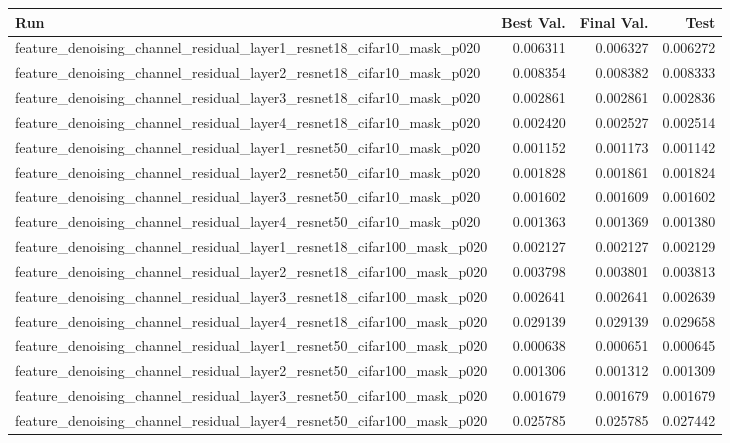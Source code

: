 \begin{tabular}{lrrr}
\toprule
Run & Best Val. & Final Val. & Test \\
\midrule
feature\_denoising\_channel\_residual\_layer1\_resnet18\_cifar10\_mask\_p020 & 0.006311 & 0.006327 & 0.006272 \\
feature\_denoising\_channel\_residual\_layer2\_resnet18\_cifar10\_mask\_p020 & 0.008354 & 0.008382 & 0.008333 \\
feature\_denoising\_channel\_residual\_layer3\_resnet18\_cifar10\_mask\_p020 & 0.002861 & 0.002861 & 0.002836 \\
feature\_denoising\_channel\_residual\_layer4\_resnet18\_cifar10\_mask\_p020 & 0.002420 & 0.002527 & 0.002514 \\
feature\_denoising\_channel\_residual\_layer1\_resnet50\_cifar10\_mask\_p020 & 0.001152 & 0.001173 & 0.001142 \\
feature\_denoising\_channel\_residual\_layer2\_resnet50\_cifar10\_mask\_p020 & 0.001828 & 0.001861 & 0.001824 \\
feature\_denoising\_channel\_residual\_layer3\_resnet50\_cifar10\_mask\_p020 & 0.001602 & 0.001609 & 0.001602 \\
feature\_denoising\_channel\_residual\_layer4\_resnet50\_cifar10\_mask\_p020 & 0.001363 & 0.001369 & 0.001380 \\
feature\_denoising\_channel\_residual\_layer1\_resnet18\_cifar100\_mask\_p020 & 0.002127 & 0.002127 & 0.002129 \\
feature\_denoising\_channel\_residual\_layer2\_resnet18\_cifar100\_mask\_p020 & 0.003798 & 0.003801 & 0.003813 \\
feature\_denoising\_channel\_residual\_layer3\_resnet18\_cifar100\_mask\_p020 & 0.002641 & 0.002641 & 0.002639 \\
feature\_denoising\_channel\_residual\_layer4\_resnet18\_cifar100\_mask\_p020 & 0.029139 & 0.029139 & 0.029658 \\
feature\_denoising\_channel\_residual\_layer1\_resnet50\_cifar100\_mask\_p020 & 0.000638 & 0.000651 & 0.000645 \\
feature\_denoising\_channel\_residual\_layer2\_resnet50\_cifar100\_mask\_p020 & 0.001306 & 0.001312 & 0.001309 \\
feature\_denoising\_channel\_residual\_layer3\_resnet50\_cifar100\_mask\_p020 & 0.001679 & 0.001679 & 0.001679 \\
feature\_denoising\_channel\_residual\_layer4\_resnet50\_cifar100\_mask\_p020 & 0.025785 & 0.025785 & 0.027442 \\
\bottomrule
\end{tabular}
